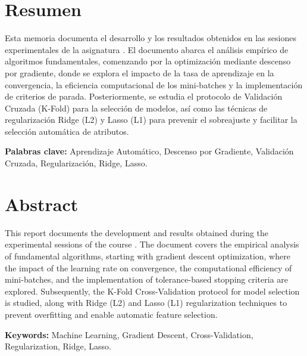 
\chapter*{Resumen}

Esta memoria documenta el desarrollo y los resultados obtenidos en las sesiones experimentales de la asignatura \Asignatura. El documento abarca el an\'{a}lisis emp\'{i}rico de algoritmos fundamentales, comenzando por la optimizaci\'{o}n mediante descenso por gradiente, donde se explora el impacto de la tasa de aprendizaje en la convergencia, la eficiencia computacional de los mini-batches y la implementaci\'{o}n de criterios de parada. Posteriormente, se estudia el protocolo de Validaci\'{o}n Cruzada (K-Fold) para la selecci\'{o}n de modelos, as\'{i} como las t\'{e}cnicas de regularizaci\'{o}n Ridge (L2) y Lasso (L1) para prevenir el sobreajuste y facilitar la selecci\'{o}n autom\'{a}tica de atributos.

\vspace{0.5cm}
\textbf{Palabras clave:} Aprendizaje Autom\'{a}tico, Descenso por Gradiente, Validaci\'{o}n Cruzada, Regularizaci\'{o}n, Ridge, Lasso.

\newpage

\chapter*{Abstract}

This report documents the development and results obtained during the experimental sessions of the course \Asignatura. The document covers the empirical analysis of fundamental algorithms, starting with gradient descent optimization, where the impact of the learning rate on convergence, the computational efficiency of mini-batches, and the implementation of tolerance-based stopping criteria are explored. Subsequently, the K-Fold Cross-Validation protocol for model selection is studied, along with Ridge (L2) and Lasso (L1) regularization techniques to prevent overfitting and enable automatic feature selection.

\vspace{0.5cm}
\textbf{Keywords:} Machine Learning, Gradient Descent, Cross-Validation, Regularization, Ridge, Lasso.
